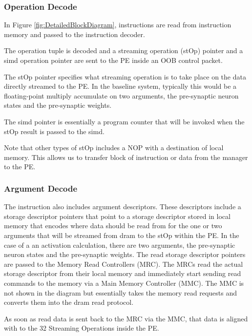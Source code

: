 \documentclass[journal]{IEEEtran}
\begin{document}
\subsubsection{Operation Decode}
\label{ssec:operationDecode}

In Figure \ref{fig:DetailedBlockDiagram}, instructions are read from instruction memory and passed to the instruction decoder.

The operation tuple is decoded and a streaming operation (stOp) pointer and a \ac{simd} operation pointer are sent to the PE inside an OOB control packet.

The stOp pointer specifies what streaming operation is to take place on the data directly streamed to the PE. In the baseline system, typically this would be a floating-point multiply accumulate on two arguments, the pre-synaptic neuron states and the pre-synaptic weights.

The \ac{simd} pointer is essentially a program counter that will be invoked when the stOp result is passed to the \ac{simd}.

Note that other types of stOp includes a NOP with a destination of local memory. This allows us to transfer block of instruction or data from the manager to the PE.


\subsubsection{Argument Decode}
\label{ssec:argumentDecode}
The instruction also includes argument descriptors. These descriptors include a storage descriptor pointers that point to a storage descriptor stored in local memory that encodes where data should be read from for the one or two arguments that will be streamed from \ac{dram} to the stOp within the PE. In the case of a \ac{an} activation calculation, there are two arguments, the pre-synaptic neuron states and the pre-synaptic weights. The read storage descriptor pointers are passed to the Memory Read Controllers (MRC). The MRCs read the actual storage descriptor from their local memory and immediately start sending read commands to the memory via a Main Memory Controller (MMC). The MMC is not shown in the diagram but essentially takes the memory read requests and converts them into the \ac{dram} read protocol.

As soon as read data is sent back to the MRC via the MMC, that data is aligned with to the 32 Streaming Operations inside the PE.
\end{document}
